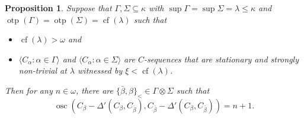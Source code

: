 \documentclass[12pt]{amsart}
\theoremstyle{definition}
\theoremstyle{plain}
\theoremstyle{plain}
\newtheorem{proposition}[definition]{Proposition}
\DeclareMathOperator{\cf}{cf}
\DeclareMathOperator{\otp}{otp}
\DeclareMathOperator{\osc}{osc}
\begin{document}
\begin{proposition}\label{prop: deltaprime}
Suppose that $\Gamma, \Sigma\subseteq \kappa$ with $\sup \Gamma=\sup \Sigma=\lambda\leq \kappa$ and $\otp(\Gamma)=\otp(\Sigma)=\cf(\lambda)$ such that
	\begin{itemize}
	\item  $\cf(\lambda)>\omega$ and
	\item  $\langle C_\alpha: \alpha\in \Gamma\rangle$ and $\langle C_\alpha: \alpha\in \Sigma \rangle$ are $C$-sequences that are stationary and strongly non-trivial at $\lambda$ witnessed by $\xi<\cf(\lambda)$.
\end{itemize} Then for any $n\in \omega$, there are $\{\bar{\beta},\beta\}_<\in \Gamma \otimes \Sigma$ such that $$\osc(C_\beta-\Delta'(C_\beta, C_{\bar{\beta}}), C_{\bar{\beta}}-\Delta'(C_\beta, C_{\bar{\beta}}))=n+1.$$
\end{proposition}
\end{document}
